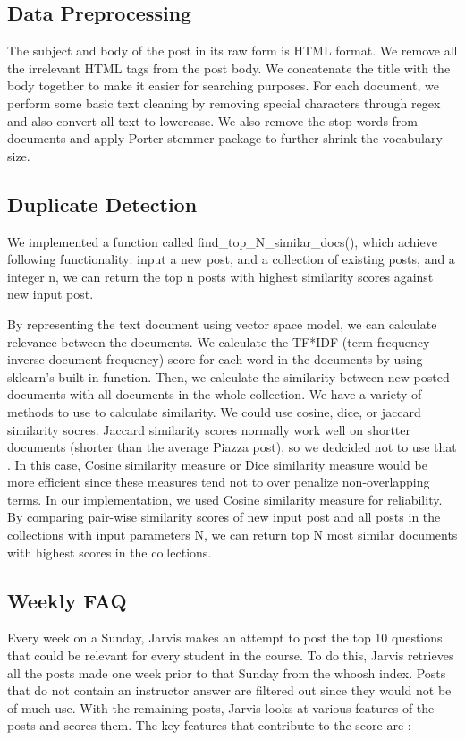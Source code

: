 \documentclass[sigconf]{acmart}
\begin{document}
\subsection{Data Preprocessing}
The subject and body of the post in its raw form is HTML format. We remove all the irrelevant HTML tags from the post body. We concatenate the title with the body together to make it easier for searching purposes. For each document, we perform some basic text cleaning by removing special characters through regex and also convert all text to lowercase. We also remove the stop words from documents and apply Porter stemmer \cite{porterstem} package to further shrink the vocabulary size. 

\subsection{Duplicate Detection}
We implemented a function called find\_top\_N\_similar\_docs(), which achieve following functionality: input a new post, and a collection of existing posts, and a integer n, we can return the top n posts with highest similarity scores against new input post. 

By representing the text document using vector space model, we can calculate relevance between the documents. We calculate the TF*IDF (term frequency–inverse document frequency) score for each word in the documents by using sklearn's built-in function. Then, we calculate the similarity between new posted documents with all documents in the whole collection. We have a variety of methods to use to calculate similarity. We could use cosine, dice, or jaccard similarity socres. Jaccard similarity scores normally work well on shortter documents (shorter than the average Piazza post), so we dedcided not to use that \cite{tamingtext}. In this case, Cosine similarity measure or Dice similarity measure would be more efficient since these measures tend not to over penalize non-overlapping terms. In our implementation, we used Cosine similarity measure for reliability. By comparing pair-wise similarity scores of new input post and all posts in the collections  with input parameters N, we can return top N most similar documents with highest scores in the collections. 

\subsection{Weekly FAQ}
Every week on a Sunday, Jarvis makes an attempt to post the top 10 questions that could be relevant for every student in the course. To do this, Jarvis retrieves all the posts made one week prior to that Sunday from the whoosh index. Posts that do not contain an instructor answer are filtered out since they would not be of much use. With the remaining posts, Jarvis looks at various features of the posts and scores them. The key features that contribute to the score are :
\end{document}
